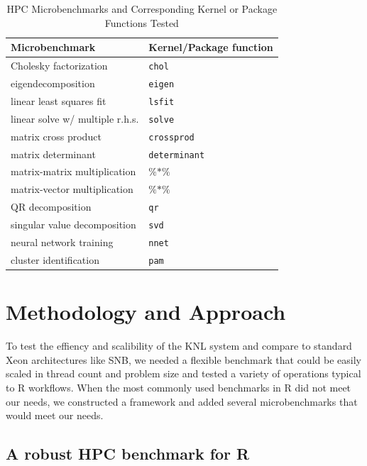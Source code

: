 \begin{table}
  \caption{HPC Microbenchmarks and Corresponding Kernel or Package Functions Tested}
  \label{tab:microbenchmarks}
  \begin{tabular}{ll}
    \toprule
    Microbenchmark & Kernel/Package function \\
    \midrule
    Cholesky factorization       & \texttt{chol} \\
    eigendecomposition           & \texttt{eigen} \\
    linear least squares fit     & \texttt{lsfit} \\
    linear solve w/ multiple r.h.s. & \texttt{solve} \\
    matrix cross product         & \texttt{crossprod} \\
    matrix determinant           & \texttt{determinant} \\
    matrix-matrix multiplication & $\%$$*$$\%$ \\
    matrix-vector multiplication & $\%$$*$$\%$ \\
    QR decomposition             & \texttt{qr} \\
    singular value decomposition & \texttt{svd} \\
    neural network training      & \texttt{nnet} \\
    cluster identification       & \texttt{pam} \\
    \bottomrule
  \end{tabular}
\end{table}

\section{Methodology and Approach}\label{sec:methodology}

To test the effiency and scalibility of the KNL system and compare to standard Xeon
architectures like SNB, we needed a flexible benchmark that could be easily scaled in
thread count and problem size and tested a variety of operations typical to R workflows.
When the most commonly used benchmarks in R did not meet our needs, we constructed a
framework and added several microbenchmarks that would meet our needs.

\subsection{A robust HPC benchmark for R} \label{sec:hpcBenchmark}

